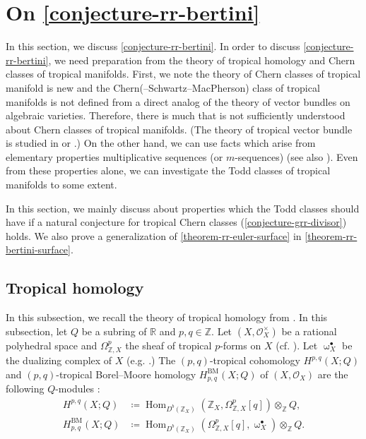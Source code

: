 \documentclass[a4paper,dvipdfmx,reqno,12pt]{amsart}
\theoremstyle{definition}
\newcommand{\deq}{\coloneqq}
\newcommand{\opn}[1]{\operatorname{#1}}
\numberwithin{equation}{section}
\begin{document}
\section{On \cref{conjecture-rr-bertini}}
\label{section-on-rr-bertini}
In this section, we discuss \cref{conjecture-rr-bertini}.
In order to discuss \cref{conjecture-rr-bertini},
we need preparation from the theory of tropical homology
and Chern classes of tropical manifolds.
First, we note 
the theory of Chern classes of tropical manifold
\cite{demedrano2023chern} is new and 
the Chern(--Schwartz--MacPherson) class of
tropical manifolds is not defined from a direct analog
of the theory of vector bundles on algebraic varieties.
Therefore, there is much that is not sufficiently
understood about Chern classes of tropical manifolds.
(The theory of tropical vector bundle is studied
in \cite{MR2961320,MR4646329} or 
\cite[Theorem 1.8]{amini2020hodge}.)
On the other hand, we can use facts 
which arise from elementary properties
multiplicative sequences (or $m$-sequences)
\cite[]{MR1335917}
(see also \cite[]{MR440554}).
Even from these properties alone,
we can investigate the Todd classes of tropical manifolds
to some extent.

In this section, we mainly
discuss about properties which 
the Todd classes should have if
a natural conjecture for
tropical Chern classes
(\cref{conjecture-grr-divisor}) holds.
We also prove a generalization of 
\cref{theorem-rr-euler-surface}
in \cref{theorem-rr-bertini-surface}.

\subsection{Tropical homology}
In this subsection, we recall
the theory of tropical homology from
\cite{MR3330789,MR3894860,MR4637248}.
In this subsection, let
$Q$ be a subring of $\mathbb{R}$
and $p,q\in \mathbb{Z}$.
Let $(X,\mathcal{O}_X^{\times})$ be
a rational polyhedral space and 
$\Omega_{\mathbb{Z},X}^{p}$
the sheaf of tropical $p$-forms
on $X$ \cite[Definition 2.7]{MR4637248}
(cf. \cite[]{MR3330789}).
Let $\upomega_{X}^{\bullet}$ be
the dualizing complex of $X$
(e.g. \cite[Definition 3.1.16]{MR1299726}.)
The $(p,q)$-tropical cohomology
$H^{p,q}(X;Q)$ and 
$(p,q)$-tropical Borel--Moore homology
$H_{p,q}^{\mathrm{BM}}(X;Q)$ of $(X,\mathcal{O}_X)$
are the following $Q$-modules
\cite[Definition 4.1 and 4.3]{MR4637248}:
\begin{align}
H^{p,q}(X;Q)&\deq \opn{Hom}_{D^{b}(\mathbb{Z}_X)}(
\mathbb{Z}_X,\Omega_{\mathbb{Z},X}^{p}[q])
\otimes_{\mathbb{Z}} Q, \\
H_{p,q}^{\mathrm{BM}}(X;Q)
&\deq \opn{Hom}_{D^{b}(\mathbb{Z}_X)}
(\Omega_{\mathbb{Z},X}^{p}[q],\upomega_{X}^{\bullet})
\otimes_{\mathbb{Z}}Q.
\end{align}
\end{document}
